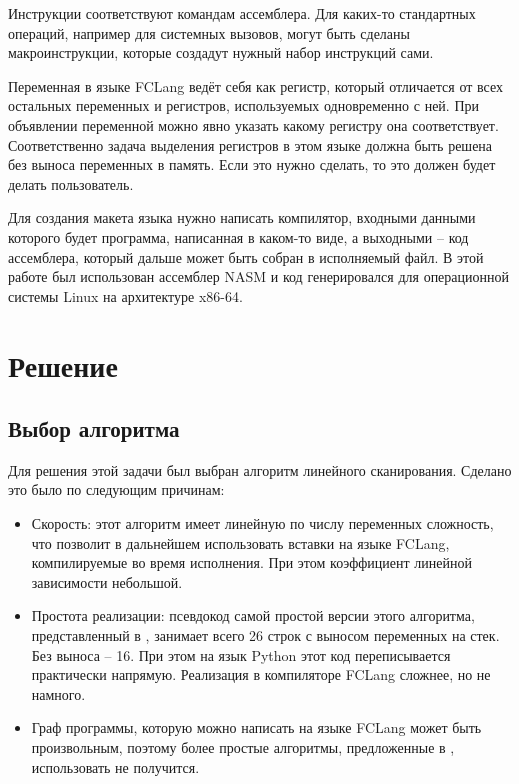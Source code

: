 \documentclass[a4paper,14pt]{extarticle}
\begin{document}
Инструкции соответствуют командам ассемблера.
Для каких-то стандартных операций, например для системных вызовов, могут быть сделаны макроинструкции, которые создадут нужный набор инструкций сами.

Переменная в языке FCLang ведёт себя как регистр, который отличается от всех остальных переменных и регистров, используемых одновременно с ней.
При объявлении переменной можно явно указать какому регистру она соответствует.
Соответственно задача выделения регистров в этом языке должна быть решена без выноса переменных в память.
Если это нужно сделать, то это должен будет делать пользователь.

Для создания макета языка нужно написать компилятор, входными данными которого будет программа, написанная в каком-то виде,
а выходными -- код ассемблера, который дальше может быть собран в исполняемый файл.
В этой работе был использован ассемблер NASM и код генерировался для операционной системы Linux на архитектуре x86-64.

\section{Решение}
\subsection{Выбор алгоритма}

Для решения этой задачи был выбран алгоритм линейного сканирования.
Сделано это было по следующим причинам:
\begin{itemize}
    \item Скорость: этот алгоритм имеет линейную по числу переменных сложность, что позволит в дальнейшем использовать вставки на языке FCLang, компилируемые во время исполнения.
        При этом коэффициент линейной зависимости небольшой.
    \item Простота реализации: псевдокод самой простой версии этого алгоритма, представленный в \cite{poletto_linear_1999}, занимает всего 26 строк с выносом переменных на стек.
        Без выноса -- 16.
        При этом на язык Python этот код переписывается практически напрямую.
        Реализация в компиляторе FCLang сложнее, но не намного.
    \item Граф программы, которую можно написать на языке FCLang может быть произвольным, 
        поэтому более простые алгоритмы, предложенные в \cite{hutchison_register_2005}, использовать не получится.
\end{itemize}
\end{document}
